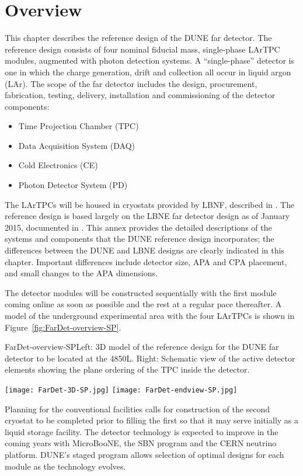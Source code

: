 \section{Overview}
\label{sec:detectors-fd-ref-ov}


This chapter describes the reference design of the DUNE far detector.
The reference design consists of four nominal  fiducial
mass, single-phase LArTPC modules, augmented with photon detection
systems.  A ``single-phase'' detector is one in which the charge
generation, drift and collection all occur in liquid argon (LAr). The
scope of the far detector includes the design, procurement,
fabrication, testing, delivery, installation and commissioning of the
detector components:
\begin{itemize}
\item Time Projection Chamber (TPC)
\item Data Acquisition System (DAQ)  
\item Cold Electronics (CE)
\item Photon Detector System (PD)
\end{itemize}
The LArTPCs will be housed in cryostats provided by LBNF, described in
\vollbnf. The reference design is based largely on the LBNE far
detector design as of January 2015, documented in \anxlbnefd. This
annex provides the detailed descriptions of the systems and components
that the DUNE reference design incorporates; the differences between
the DUNE and LBNE designs are clearly indicated in this
chapter. Important differences include detector size, APA and CPA
placement, and small changes to the APA dimensions.

The detector modules will be constructed sequentially
with the first module coming online as soon as possible and the rest
at a regular pace thereafter. A model of the underground experimental area with
the four  LArTPCs is shown in
Figure~\ref{fig:FarDet-overview-SP}. 
\begin{cdrfigure}{FarDet-overview-SP}{Left: 3D model of the reference design for the DUNE far detector to be located at the 4850L. Right: Schematic view of the active detector elements showing the plane ordering of the TPC inside the detector.}
\centering
\begin{minipage}[b]{1.0\textwidth}
\begin{center}
\texttt{[image: FarDet-3D-SP.jpg]}
\texttt{[image: FarDet-endview-SP.jpg]}
\end{center}
\end{minipage}
\end{cdrfigure}
Planning for the conventional facilities calls for construction of the
second cryostat to be completed prior to filling the first so that it
may serve initially as a liquid storage facility.  The detector
technology is expected to improve in the coming years with MicroBooNE,
the SBN program and the CERN neutrino platform.  DUNE's staged program
allows selection of optimal designs for each module as the technology
evolves.


